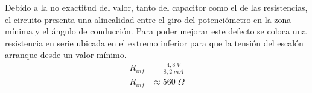 \documentclass{article}
\begin{document}
Debido a la no exactitud del valor, tanto del capacitor como el de las resistencias, el circuito presenta una alinealidad entre el giro del potenciómetro en la zona mínima y el ángulo de conducción. Para poder mejorar este defecto se coloca una resistencia en serie ubicada en el extremo inferior para que la tensión del escalón arranque desde un valor mínimo.
\begin{align*}
R_{inf} &= \frac{4,8 \; V}{8,2 \; mA} \\
R_{inf} &\approx 560 \; \Omega
\end{align*}
\end{document}
